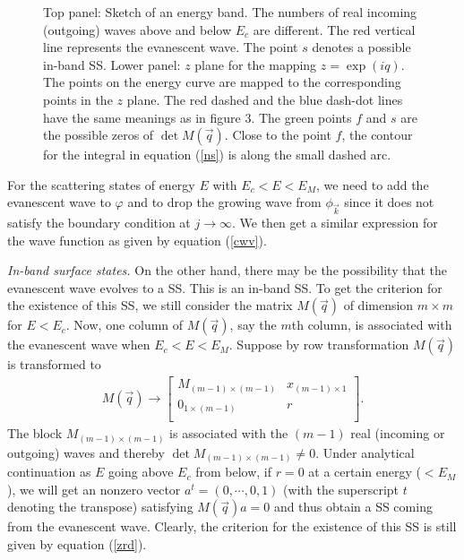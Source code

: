 \documentclass[aps,pra,amsmath,twocolumn,showpacs,bibnotes,10pt]{revtex4-1}
\begin{document}
\begin{figure}[t]
\centerline{}
\caption{Top panel: Sketch of an energy band. The numbers of real incoming (outgoing) waves above and below $E_c$ are different. The red vertical line represents the evanescent wave. The point $s$ denotes a possible in-band SS. Lower panel: $z$ plane for the mapping $z = \exp(iq)$. The points on the energy curve are mapped to the corresponding points in the $z$ plane. The red dashed and the blue dash-dot lines have the same meanings as in figure 3. The green points $f$ and $s$ are the possible zeros of $\det M(\vec q)$. Close to the point $f$, the contour for the integral in equation (\ref{ns}) is along the small dashed arc.} 
\end{figure}

For the scattering states of energy $E$ with $E_c < E < E_M$, we need to add the evanescent wave to $\varphi$ and to drop the growing wave from $\phi_{\vec k}$ since it does not satisfy the boundary condition at $j \to \infty$. We then get a similar expression for the wave function as given by equation (\ref{cwv}). 

{\it In-band surface states.} On the other hand, there may be the possibility that the evanescent wave evolves to a SS. This is an in-band SS. To get the criterion for the existence of this SS, we still consider the matrix $M(\vec q)$ of dimension $m\times m$ for $E<E_c$. Now, one column of $M(\vec q)$, say the $m$th column, is associated with the evanescent wave when $E_c<E<E_M$. Suppose by row transformation $M(\vec q)$ is transformed to 
\begin{eqnarray}
M(\vec q) \to \begin{bmatrix}
	 M_{(m-1)\times(m-1)}&x_{(m-1)\times 1}\\
	0_{1\times(m-1)}&r\\
\end{bmatrix}.               
\end{eqnarray}
The block $M_{(m-1)\times(m-1)}$ is associated with the $(m-1)$ real (incoming or outgoing) waves and thereby $\det M_{(m-1)\times(m-1)} \ne 0$. Under analytical continuation as $E$ going above $E_c$ from below, if $r = 0$ at a certain energy ($< E_M$), we will get an nonzero vector $a^{t} = (0,\cdots,0,1)$ (with the superscript $t$ denoting the transpose) satisfying $M(\vec q)a = 0$ and thus obtain a SS coming from the evanescent wave. Clearly, the criterion for the existence of this SS is still given by equation (\ref{zrd}).
\end{document}
